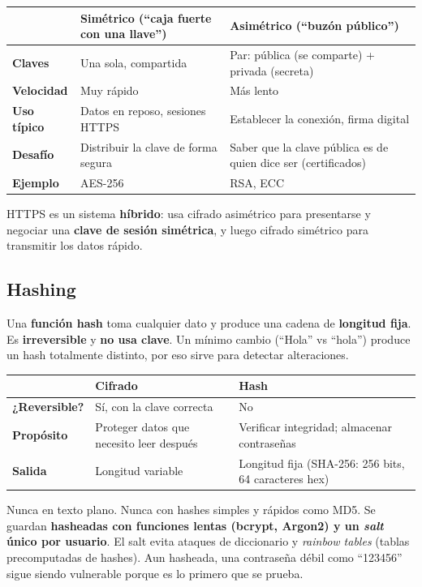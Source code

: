 \documentclass[12pt,a4paper]{article}
\begin{document}
\begin{tabularx}{\textwidth}{|>{\bfseries}p{2.6cm}|X|X|}
\hline
\rowcolor{grisClaro}
 & Sim\'etrico (``caja fuerte con una llave'') & Asim\'etrico (``buz\'on p\'ublico'') \\
\hline
Claves & Una sola, compartida & Par: p\'ublica (se comparte) + privada (secreta) \\
\hline
Velocidad & Muy r\'apido & M\'as lento \\
\hline
Uso t\'ipico & Datos en reposo, sesiones HTTPS & Establecer la conexi\'on, firma digital \\
\hline
Desaf\'io & Distribuir la clave de forma segura & Saber que la clave p\'ublica es de quien dice ser (certificados) \\
\hline
Ejemplo & AES-256 & RSA, ECC \\
\hline
\end{tabularx}

\begin{cajaNota}[title={Se usan juntos}]
HTTPS es un sistema \textbf{h\'ibrido}: usa cifrado asim\'etrico para presentarse y
negociar una \textbf{clave de sesi\'on sim\'etrica}, y luego cifrado sim\'etrico
para transmitir los datos r\'apido.
\end{cajaNota}

\subsection{Hashing}

Una \textbf{funci\'on hash} toma cualquier dato y produce una cadena de
\textbf{longitud fija}. Es \textbf{irreversible} y \textbf{no usa clave}. Un
m\'inimo cambio (``Hola'' vs ``hola'') produce un hash totalmente distinto, por eso
sirve para detectar alteraciones.

\begin{tabularx}{\textwidth}{|>{\bfseries}p{2.6cm}|X|X|}
\hline
\rowcolor{grisClaro}
 & Cifrado & Hash \\
\hline
¿Reversible? & S\'i, con la clave correcta & No \\
\hline
Prop\'osito & Proteger datos que necesito leer despu\'es & Verificar integridad; almacenar contrase\~nas \\
\hline
Salida & Longitud variable & Longitud fija (SHA-256: 256 bits, 64 caracteres hex) \\
\hline
\end{tabularx}

\begin{cajaNota}[title={Almacenamiento de contrase\~nas}]
Nunca en texto plano. Nunca con hashes simples y r\'apidos como MD5. Se guardan
\textbf{hasheadas con funciones lentas (bcrypt, Argon2) y un \emph{salt} \'unico
por usuario}. El salt evita ataques de diccionario y \emph{rainbow tables}
(tablas precomputadas de hashes). Aun hasheada, una contrase\~na d\'ebil como
``123456'' sigue siendo vulnerable porque es lo primero que se prueba.
\end{cajaNota}
\end{document}
